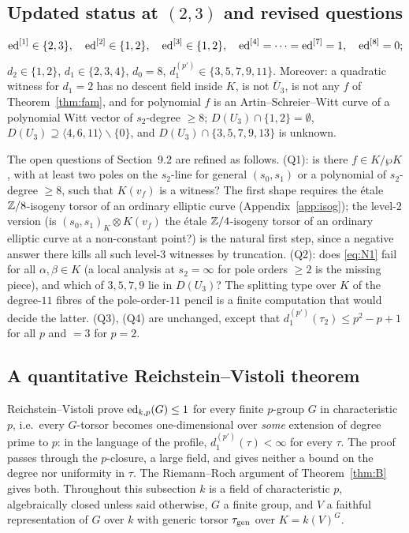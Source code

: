 \subsection{Updated status at \texorpdfstring{$(2,3)$}{(2,3)} and revised questions}

\begin{theorem}[status at $(2,3)$]\label{thm:status}
\[
\operatorname{ed}^{[1]}\in\{2,3\},\quad\operatorname{ed}^{[2]}\in\{1,2\},\quad\operatorname{ed}^{[3]}\in\{1,2\},\quad
\operatorname{ed}^{[4]}=\dots=\operatorname{ed}^{[7]}=1,\quad\operatorname{ed}^{[8]}=0;
\]
$d_2\in\{1,2\}$, $d_1\in\{2,3,4\}$, $d_0=8$, $d_1^{(p')}\in\{3,5,7,9,11\}$. Moreover:
a quadratic witness for $d_1=2$ has no descent field inside $K$, is not $\bar U_3$,
is not any $f$ of Theorem~\ref{thm:fam}, and for polynomial $f$ is an
Artin--Schreier--Witt curve of a polynomial Witt vector of $s_2$-degree $\ge8$;
$D(U_3)\cap\{1,2\}=\emptyset$, $D(U_3)\supseteq\langle4,6,11\rangle\smallsetminus\{0\}$,
and $D(U_3)\cap\{3,5,7,9,13\}$ is unknown. 
\end{theorem}

The open questions of Section~9.2 are refined as follows. (Q1): is there
$f\in K/\wp K$, with at least two poles on the $s_2$-line for general $(s_0,s_1)$ or a
polynomial of $s_2$-degree $\ge8$, such that $K(v_f)$ is a witness? The first shape
requires the \'etale $\mathbb Z/8$-isogeny torsor of an ordinary elliptic curve
(Appendix~\ref{app:isog}); the level-$2$ version (is $(s_0,s_1)_K\otimes K(v_f)$ the
\'etale $\mathbb Z/4$-isogeny torsor of an ordinary elliptic curve at a non-constant point?) is
the natural first step, since a negative answer there kills all such level-$3$
witnesses by truncation. (Q2): does \eqref{eq:N1} fail for all $\alpha,\beta\in K$
(a local analysis at $s_2=\infty$ for pole orders $\ge2$ is the missing piece), and
which of $3,5,7,9$ lie in $D(U_3)$? The splitting type over $K$ of the degree-$11$
fibres of the pole-order-$11$ pencil is a finite computation that would decide the
latter. (Q3), (Q4) are unchanged, except that $d_1^{(p')}(\tau_2)\le p^2-p+1$ for all
$p$ and $=3$ for $p=2$.

\subsection{A quantitative Reichstein--Vistoli theorem}\label{ss:qRV}

Reichstein--Vistoli \cite{RV} prove $\operatorname{ed}_{k,p}(G)\le1$ for every finite $p$-group $G$ in
characteristic $p$, i.e.\ every $G$-torsor becomes one-dimensional over \emph{some}
extension of degree prime to $p$: in the language of the profile, $d_1^{(p')}(\tau)<\infty$
for every $\tau$. The proof passes through the $p$-closure, a large field, and gives
neither a bound on the degree nor uniformity in $\tau$. The Riemann--Roch argument of
Theorem~\ref{thm:B} gives both. Throughout this subsection $k$ is a field of
characteristic $p$, algebraically closed unless said otherwise, $G$ a finite group, and
$V$ a faithful representation of $G$ over $k$ with generic torsor $\tau_{\mathrm{gen}}$ over
$K=k(V)^G$.

